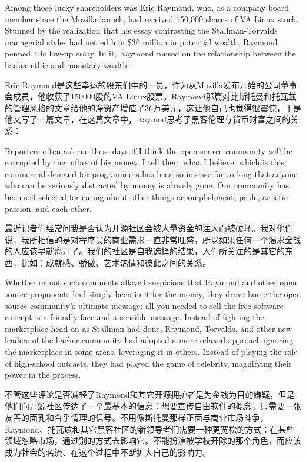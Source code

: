 \ifdefined\eng
Among those lucky shareholders was Eric Raymond, who, as a company board member since the Mozilla launch, had received 150,000 shares of VA Linux stock. Stunned by the realization that his essay contrasting the Stallman-Torvalds managerial styles had netted him \$36 million in potential wealth, Raymond penned a follow-up essay. In it, Raymond mused on the relationship between the hacker ethic and monetary wealth:
\fi

\ifdefined\chs
Eric Raymond是这些幸运的股东们中的一员，作为从Mozilla发布开始的公司董事会成员，他收获了150000股的VA Linux股票。Raymond那篇对比斯托曼和托瓦兹的管理风格的文章给他的净资产增值了36万美元，这让他自己也觉得很震惊，于是他又写了一篇文章，在这篇文章中，Raymod思考了黑客伦理与货币财富之间的关系：
\fi

\ifdefined\eng
Reporters often ask me these days if I think the open-source community will be corrupted by the influx of big money. I tell them what I believe, which is this: commercial demand for programmers has been so intense for so long that anyone who can be seriously distracted by money is already gone. Our community has been self-selected for caring about other things-accomplishment, pride, artistic passion, and each other.\endnote{}
\fi

\ifdefined\chs
最近记者们经常问我是否认为开源社区会被大量资金的注入而被破坏。我对他们说，我所相信的是对程序员的商业需求一直非常旺盛，所以如果任何一个渴求金钱的人应该早就离开了。我们的社区是自我选择的结果，人们所关注的是其它的东西，比如：成就感、骄傲、艺术热情和彼此之间的关系。\endnote{}
\fi

\ifdefined\eng
Whether or not such comments allayed suspicions that Raymond and other open source proponents had simply been in it for the money, they drove home the open source community's ultimate message: all you needed to sell the free software concept is a friendly face and a sensible message. Instead of fighting the marketplace head-on as Stallman had done, Raymond, Torvalds, and other new leaders of the hacker community had adopted a more relaxed approach-ignoring the marketplace in some areas, leveraging it in others. Instead of playing the role of high-school outcasts, they had played the game of celebrity, magnifying their power in the process.
\fi

\ifdefined\chs
不管这些评论是否减轻了Raymond和其它开源拥护者是为金钱为目的嫌疑，但是他们向开源社区传达了一个最基本的信息：想要宣传自由软件的概念，只需要一张友善的面孔和合乎情理的信号。不用像斯托曼那样正面与商业市场斗争，Raymond、托瓦兹和其它黑客社区的新领导者们需要一种更宽松的方式：在某些领域忽略市场，通过别的方式去影响它。不能扮演被学校开除的那个角色，而应该成为社会的名流、在这个过程中不断扩大自己的影响力。
\fi

